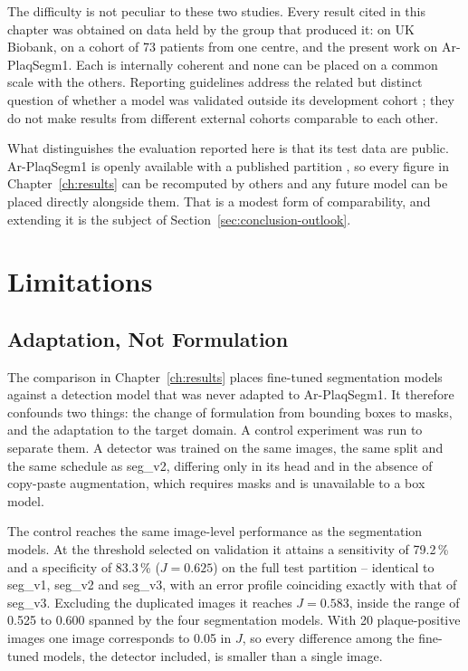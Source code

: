 The difficulty is not peculiar to these two studies. Every result cited in this chapter was
obtained on data held by the group that produced it: \textcite{omarov2024deep} on UK Biobank,
\textcite{stamos2025} on a cohort of 73 patients from one centre, and the present work on
Ar-PlaqSegm1. Each is internally coherent and none can be placed on a common scale with the
others. Reporting guidelines address the related but distinct question of whether a model was
validated outside its development cohort \cite{collins2015tripod, mongan2020claim}; they do
not make results from different external cohorts comparable to each other.

What distinguishes the evaluation reported here is that its test data are public.
Ar-PlaqSegm1 is openly available with a published partition \cite{rulloni2025arplaqsegm1}, so
every figure in Chapter~\ref{ch:results} can be recomputed by others and any future model can be
placed directly alongside them. That is a modest form of comparability, and extending it is the
subject of Section~\ref{sec:conclusion-outlook}.

\section{Limitations}
\label{sec:discussion-limitations}

\subsection{Adaptation, Not Formulation}
\label{subsec:limitations-control}

The comparison in Chapter~\ref{ch:results} places fine-tuned segmentation models against a
detection model that was never adapted to Ar-PlaqSegm1. It therefore confounds two things: the
change of formulation from bounding boxes to masks, and the adaptation to the target domain. A
control experiment was run to separate them. A detector was trained on the same images, the same
split and the same schedule as seg\_v2, differing only in its head and in the absence of
copy-paste augmentation, which requires masks and is unavailable to a box model.

The control reaches the same image-level performance as the segmentation models. At the threshold
selected on validation it attains a sensitivity of 79.2\,\% and a specificity of 83.3\,\%
($J = 0.625$) on the full test partition -- identical to seg\_v1, seg\_v2 and seg\_v3, with an
error profile coinciding exactly with that of seg\_v3. Excluding the duplicated images it reaches
$J = 0.583$, inside the range of 0.525 to 0.600 spanned by the four segmentation models. With 20
plaque-positive images one image corresponds to 0.05 in $J$, so every difference among the
fine-tuned models, the detector included, is smaller than a single image.

